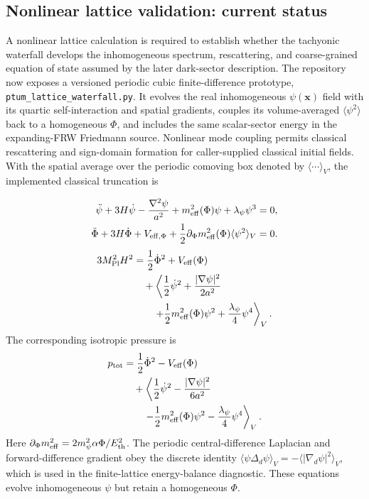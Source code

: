 \documentclass[epj]{svjour}
\begin{document}
\subsection{Nonlinear lattice validation: current status}
\label{app:lattice-status}

A nonlinear lattice calculation is required to establish whether the
tachyonic waterfall develops the inhomogeneous spectrum, rescattering,
and coarse-grained equation of state assumed by the later dark-sector
description. The repository now exposes a versioned periodic cubic
finite-difference prototype, \texttt{ptum\_lattice\_waterfall.py}. It
evolves the real inhomogeneous $\psi(\mathbf{x})$ field with its quartic
self-interaction and spatial gradients, couples its volume-averaged
$\langle\psi^2\rangle$ back to a homogeneous $\Phi$, and includes the
same scalar-sector energy in the expanding-FRW Friedmann source.
Nonlinear mode coupling permits classical rescattering and sign-domain
formation for caller-supplied classical initial fields. With the
spatial average over the periodic comoving box denoted by
$\langle\cdots\rangle_V$, the implemented classical truncation is

\begin{align}
\ddot\psi+3H\dot\psi-\frac{\nabla^2\psi}{a^2}
+m_{\rm eff}^2(\Phi)\psi+\lambda_\psi\psi^3&=0,
\label{eq:ptum_lattice_psi}\\
\ddot\Phi+3H\dot\Phi+V_{{\rm eff},\Phi}
+\frac12\partial_\Phi m_{\rm eff}^2(\Phi)
\langle\psi^2\rangle_V&=0.
\label{eq:ptum_lattice_phi}
\end{align}
\begin{equation}
\begin{aligned}
3M_{\rm Pl}^2H^2
&=\frac12\dot\Phi^2+V_{\rm eff}(\Phi)\\
&\quad+\left\langle
\frac12\dot\psi^2+\frac{|\nabla\psi|^2}{2a^2}\right.\\
&\qquad\left.+\frac12m_{\rm eff}^2(\Phi)\psi^2
+\frac{\lambda_\psi}{4}\psi^4
\right\rangle_V.
\end{aligned}
\label{eq:ptum_lattice_friedmann}
\end{equation}
The corresponding isotropic pressure is
\begin{equation}
\begin{aligned}
p_{\rm tot}
&=\frac12\dot\Phi^2-V_{\rm eff}(\Phi)\\
&\quad+\left\langle
\frac12\dot\psi^2-\frac{|\nabla\psi|^2}{6a^2}\right.\\
&\qquad\left.-\frac12m_{\rm eff}^2(\Phi)\psi^2
-\frac{\lambda_\psi}{4}\psi^4
\right\rangle_V.
\end{aligned}
\label{eq:ptum_lattice_pressure}
\end{equation}
Here $\partial_\Phi m_{\rm eff}^2=
2m_\psi^2\alpha\Phi/E_{\rm th}^2$. The periodic central-difference
Laplacian and forward-difference gradient obey the discrete identity
$\langle\psi\Delta_d\psi\rangle_V
=-\langle|\nabla_d\psi|^2\rangle_V$, which is used in the
finite-lattice energy-balance diagnostic. These equations evolve
inhomogeneous $\psi$ but retain a homogeneous $\Phi$.
\end{document}
